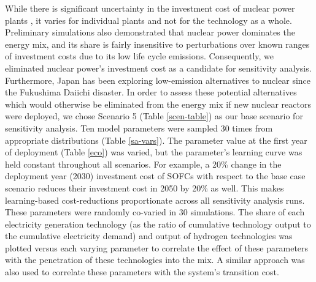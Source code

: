 While there is significant uncertainty in the investment cost of nuclear power plants \cite{lovering_historical_2016}, it varies for individual plants and not for the technology as a whole. Preliminary simulations also demonstrated that nuclear power dominates the energy mix, and its share is fairly insensitive to perturbations over known ranges of investment costs \cite{lovering_historical_2016} due to its low life cycle emissions. Consequently, we eliminated nuclear power's investment cost as a candidate for sensitivity analysis. Furthermore, Japan has been exploring low-emission alternatives to nuclear since the Fukushima Daiichi disaster. In order to assess these potential alternatives which would otherwise be eliminated from the energy mix if new nuclear reactors were deployed, we chose Scenario 5 (Table \ref{scen-table}) as our base scenario for sensitivity analysis. Ten model parameters were sampled 30 times from appropriate distributions (Table \ref{sa-vars}). The parameter value at the first year of deployment (Table \ref{eco}) was varied, but the parameter's learning curve was held constant throughout all scenarios. For example, a 20\% change in the deployment year (2030) investment cost of \gls{SOFC}s with respect to the base case scenario reduces their investment cost in 2050 by 20\% as well. This makes learning-based cost-reductions proportionate across all sensitivity analysis runs. These parameters were randomly co-varied in 30 simulations. The share of each electricity generation technology (as the ratio of cumulative technology output to the cumulative electricity demand) and output of hydrogen technologies was plotted versus each varying parameter to correlate the effect of these parameters with the penetration of these technologies into the mix. A similar approach was also used to correlate these parameters with the system's transition cost.

